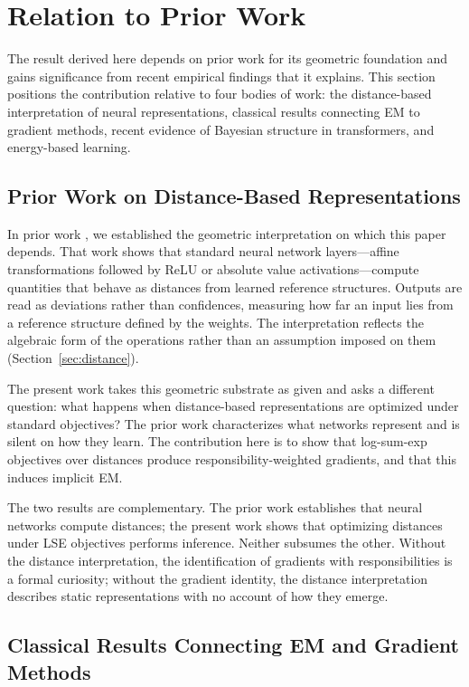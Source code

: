\section{Relation to Prior Work}

The result derived here depends on prior work for its geometric foundation and gains significance from recent empirical findings that it explains. This section positions the contribution relative to four bodies of work: the distance-based interpretation of neural representations, classical results connecting EM to gradient methods, recent evidence of Bayesian structure in transformers, and energy-based learning.

\subsection{Prior Work on Distance-Based Representations}

In prior work \citep{oursland2024interpreting}, we established the geometric interpretation on which this paper depends. That work shows that standard neural network layers---affine transformations followed by ReLU or absolute value activations---compute quantities that behave as distances from learned reference structures. Outputs are read as deviations rather than confidences, measuring how far an input lies from a reference structure defined by the weights. The interpretation reflects the algebraic form of the operations rather than an assumption imposed on them (Section~\ref{sec:distance}).

The present work takes this geometric substrate as given and asks a different question: what happens when distance-based representations are optimized under standard objectives? The prior work characterizes what networks represent and is silent on how they learn. The contribution here is to show that log-sum-exp objectives over distances produce responsibility-weighted gradients, and that this induces implicit EM.

The two results are complementary. The prior work establishes that neural networks compute distances; the present work shows that optimizing distances under LSE objectives performs inference. Neither subsumes the other. Without the distance interpretation, the identification of gradients with responsibilities is a formal curiosity; without the gradient identity, the distance interpretation describes static representations with no account of how they emerge.

\subsection{Classical Results Connecting EM and Gradient Methods}
\label{sec:fisher}

